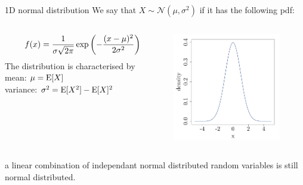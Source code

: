
\begin{frame}{1D normal distribution}
We say that $X \sim \mathcal{N}(\mu,\sigma^2)$ if it has the following pdf:
\begin{columns}
  \begin{column}{0.6\textwidth}
  \begin{equation*}
  f(x) = \frac{1}{\sigma \sqrt{2 \pi}} \exp \left(-\frac{(x-\mu)^2}{2 \sigma^2} \right)
  \vspace{3mm}
  \end{equation*}
  The distribution is characterised by\\
      \qquad mean: $\mu = \operatorname*{E} [X]$\\
      \qquad variance: $\sigma^2 = \operatorname*{E} [X^2] - \operatorname*{E}[X]^2$
  \end{column}
  \begin{column}{0.5\textwidth}
  \begin{center}
   \includegraphics[height=4.7cm]{1_stat_models/figures/R/MVN_dens1} 
  \end{center}
  \end{column}
\end{columns}
\vspace{2mm}
 a linear combination of independant normal distributed random variables is still normal distributed.
\end{frame}

